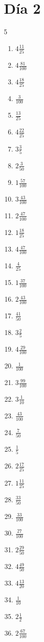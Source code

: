 \documentclass[12pt]{article}
\begin{document}
\section*{Día 2}
\begin{multicols}{5}\begin{enumerate}
\item $ 4 \frac{11}{25} $
\item $ 4 \frac{81}{100} $
\item $ 4 \frac{18}{25} $
\item $ \frac{3}{100} $
\item $ \frac{13}{25} $
\item $ 4 \frac{22}{25} $
\item $ 3 \frac{3}{5} $
\item $ 2 \frac{3}{50} $
\item $ 1 \frac{57}{100} $
\item $ 3 \frac{43}{100} $
\item $ 2 \frac{47}{100} $
\item $ 1 \frac{18}{25} $
\item $ 4 \frac{47}{100} $
\item $ \frac{4}{25} $
\item $ 1 \frac{37}{100} $
\item $ 2 \frac{43}{100} $
\item $ \frac{41}{50} $
\item $ 3 \frac{2}{5} $
\item $ 4 \frac{29}{100} $
\item $ \frac{1}{100} $
\item $ 3 \frac{99}{100} $
\item $ 3 \frac{1}{10} $
\item $ \frac{43}{100} $
\item $ \frac{7}{50} $
\item $ \frac{1}{5} $
\item $ 2 \frac{17}{25} $
\item $ 1 \frac{11}{25} $
\item $ \frac{33}{50} $
\item $ \frac{33}{100} $
\item $ \frac{27}{100} $
\item $ 2 \frac{29}{50} $
\item $ 4 \frac{49}{50} $
\item $ 4 \frac{13}{20} $
\item $ \frac{1}{10} $
\item $ 2 \frac{1}{2} $
\item $ 2 \frac{67}{100} $

\end{enumerate}
\end{multicols}
\end{document}
